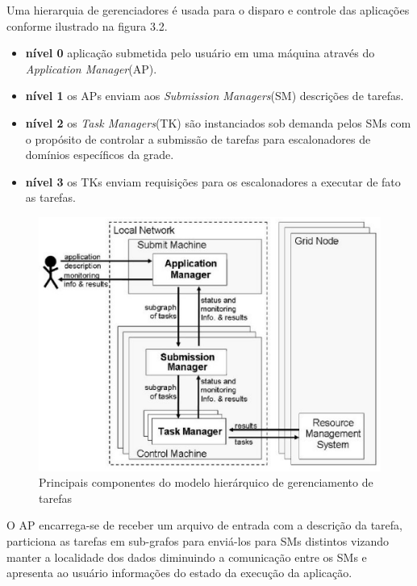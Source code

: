 Uma hierarquia de gerenciadores é usada para o disparo e controle das aplicações conforme ilustrado na figura 3.2.

\begin{itemize}
	\item \textbf{nível 0} aplicação submetida pelo usuário em uma máquina através do \emph{Application Manager}(AP).
	\item \textbf{nível 1} os APs enviam aos \emph{Submission Managers}(SM) descrições de tarefas.
	\item \textbf{nível 2} os \emph{Task Managers}(TK) são instanciados sob demanda pelos SMs com o propósito de controlar a submissão de tarefas para escalonadores de domínios específicos da grade.
	\item \textbf{nível 3} os TKs enviam requisições para os escalonadores a executar de fato as tarefas.
\end{itemize}

\begin{figure}[htb]
\begin{center}
\includegraphics[scale=0.7]{./img/grand.eps}
\caption{Principais componentes do modelo hierárquico de gerenciamento de tarefas}
\label{fig:Modelo_Grand}
\end{center}
\end{figure}

O AP encarrega-se de receber um arquivo de entrada com a descrição da tarefa, particiona as tarefas em sub-grafos para enviá-los para SMs distintos vizando manter a localidade dos dados diminuindo a comunicação entre os SMs e apresenta ao usuário informações do estado da execução da aplicação.

